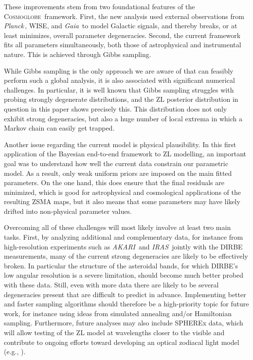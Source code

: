 \documentclass[twocolumn]{aa}
\def\Planck{\textit{Planck}}
\def\GAIA{\textit{Gaia}}
\def\IRAS{\textit{IRAS}}
\def\AKARI{\textit{AKARI}}
\newcommand{\cosmoglobe}{\textsc{Cosmoglobe}}
\begin{document}
These improvements stem from two foundational features of the
\cosmoglobe\ framework. First, the new analysis used external
observations from \Planck\,, WISE, and \GAIA\ to model Galactic signals,
and thereby breaks, or at least minimizes, overall parameter
degeneracies. Second, the current framework fits all parameters
simultaneously, both those of astrophysical and instrumental
nature. This is achieved through Gibbs sampling.

While Gibbs sampling is the only approach we are aware of that 
can feasibly perform such a global analysis, it is also associated with 
significant numerical challenges. In particular, it is well known that Gibbs
sampling struggles with probing strongly degenerate distributions, and
the ZL posterior distribution in question in this paper shows
precisely this. This distribution does not only exhibit strong
degeneracies, but also a huge number of local extrema in which a
Markov chain can easily get trapped.

Another issue regarding the current model is physical plausibility. In
this first application of the Bayesian end-to-end framework to ZL
modelling, an important goal was to understand how well the current
data constrain our parametric model. As a result, only weak uniform
priors are imposed on the main fitted parameters. On the one hand,
this does ensure that the final residuals are minimized, which is good
for astrophysical and cosmological applications of the resulting ZSMA
maps, but it also means that some parameters may have likely drifted
into non-physical parameter values.

Overcoming all of these challenges will most likely involve at least
two main tasks. First, by analyzing additional and complementary data,
for instance from high-resolution experiments such as \AKARI\ and \IRAS\, 
jointly with the DIRBE measurements, many of the current strong
degeneracies are likely to be effectively broken. In particular the
structure of the asteroidal bands, for which DIRBE's low angular
resolution is a severe limitation, should become much better probed
with these data. Still, even with more data there are likely to be
several degeneracies present that are difficult to predict in
advance. Implementing better and faster sampling algorithms should
therefore be a high-priority topic for future work, for instance using
ideas from simulated annealing and/or Hamiltonian sampling.
Furthermore, future analyses may also include SPHEREx data, 
which will allow testing of the ZL model at wavelengths closer to the 
visible and contribute to ongoing efforts toward developing an optical 
zodiacal light model (e.g., \citealt{skysurf}).
\end{document}
